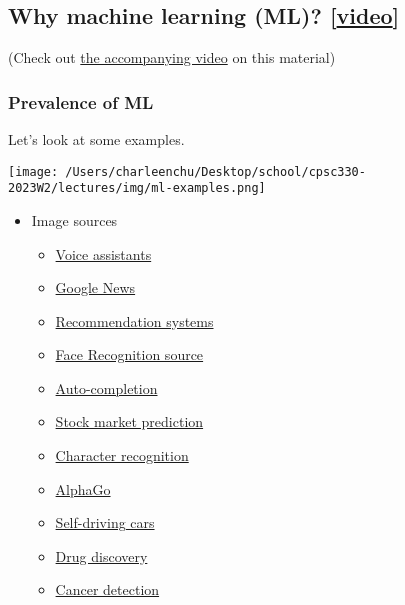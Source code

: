 \documentclass[11pt]{article}
\providecommand{\tightlist}{%
      \setlength{\itemsep}{0pt}\setlength{\parskip}{0pt}}
\begin{document}
    \subsection{\texorpdfstring{Why machine learning (ML)?
{[}\href{https://www.youtube.com/watch?v=-1hTcS5ZE4w&t=1s}{video}{]}}{Why machine learning (ML)? {[}video{]}}}\label{why-machine-learning-ml-video}

    (Check out \href{https://www.youtube.com/watch?v=-1hTcS5ZE4w&t=1s}{the
accompanying video} on this material)

    \subsubsection{Prevalence of ML}\label{prevalence-of-ml}

Let's look at some examples.

\texttt{[image: /Users/charleenchu/Desktop/school/cpsc330-2023W2/lectures/img/ml-examples.png]}

    \begin{itemize}
\tightlist
\item
  Image sources

  \begin{itemize}
  \tightlist
  \item
    \href{https://geeksfl.com/blog/best-voice-assistant/}{Voice
    assistants}
  \item
    \href{https://news.google.com}{Google News}\\
  \item
    \href{https://en.wikipedia.org/wiki/Recommender_system}{Recommendation
    systems}
  \item
    \href{https://startupleague.online/blog/3dss-tech-facial-recognition-technology/}{Face
    Recognition source}
  \item
    \href{https://9to5google.com/2020/08/10/android-11-autofill-keyboard/}{Auto-completion}
  \item
    \href{https://hbr.org/2019/12/what-machine-learning-will-mean-for-asset-managers}{Stock
    market prediction}\\
  \item
    \href{https://en.wikipedia.org/wiki/Handwriting_recognition}{Character
    recognition}\\
  \item
    \href{https://deepmind.com/alphago-china}{AlphaGo}
  \item
    \href{https://mc.ai/artificial-intelligence-in-self-driving-cars\%E2\%80\%8A-\%E2\%80\%8Ahow-far-have-we-gotten/}{Self-driving
    cars}
  \item
    \href{https://www.nature.com/articles/d41586-018-05267-x}{Drug
    discovery}
  \item
    \href{https://venturebeat.com/2018/10/12/google-ai-claims-99-accuracy-in-metastatic-breast-cancer-detection/}{Cancer
    detection}
  \end{itemize}
\end{itemize}
\end{document}
